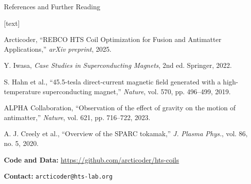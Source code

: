 \begin{frame}{References and Further Reading}
    \begin{thebibliography}{10}
        [text]
        
         Arcticoder, ``REBCO HTS Coil Optimization for Fusion and Antimatter Applications,'' \textit{arXiv preprint}, 2025.
        
         Y. Iwasa, \textit{Case Studies in Superconducting Magnets}, 2nd ed. Springer, 2022.
        
         S. Hahn et al., ``45.5-tesla direct-current magnetic field generated with a high-temperature superconducting magnet,'' \textit{Nature}, vol. 570, pp. 496--499, 2019.
        
         ALPHA Collaboration, ``Observation of the effect of gravity on the motion of antimatter,'' \textit{Nature}, vol. 621, pp. 716--722, 2023.
        
         A. J. Creely et al., ``Overview of the SPARC tokamak,'' \textit{J. Plasma Phys.}, vol. 86, no. 5, 2020.
        
    \end{thebibliography}
    
    \vspace{0.5cm}
    \textbf{Code and Data:} \url{https://github.com/arcticoder/hts-coils}
    
    \textbf{Contact:} \texttt{arcticoder@hts-lab.org}
\end{frame}

